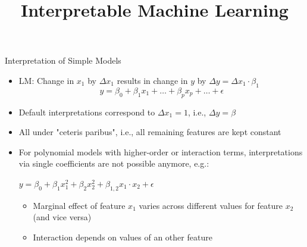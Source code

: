 \documentclass[11pt,compress,t,notes=noshow, aspectratio=169, xcolor=table]{beamer}
\title{Interpretable Machine Learning}
\date{}
\begin{document}
\newcommand{\titlefigure}{figure_man/me_movement}
\newcommand{\learninggoals}{
\item Why parameter-based interpretations are not always possible for parametric models
\item How marginal effects can be used in such cases
\item Drawbacks of marginal effects
\item Model-agnostic applicability}


\begin{frame}{Interpretation of Simple Models}

\begin{itemize}
\itemsep1em
\item LM: Change in $x_1$ by $\Delta x_1$ results in change in $y$ by $\Delta y = \Delta x_1 \cdot \beta_1$
\begin{equation*}
y = \beta_0 + \beta_1 x_1 + \dots + \beta_p x_p + \dots + \epsilon
\end{equation*}
\item Default interpretations correspond to $\Delta x_1 = 1$, i.e., $\Delta y = \beta$
\item All under "ceteris paribus", i.e., all remaining features are kept constant
\item For polynomial models with higher-order or interaction terms, interpretations via single coefficients are not possible anymore, e.g.:

\medskip

\centerline{$y = \beta_0 + \beta_{1} x_1^2 + \beta_{2} x_2^2 + \beta_{1, 2} x_1 \cdot x_2 + \epsilon$}

\medskip

\begin{itemize}
%
\item Marginal effect of feature $x_1$ varies across different values for feature $x_2$ (and vice versa)
\item Interaction depends on values of an other feature
\end{itemize}
\end{itemize}
\end{frame}
\end{document}
